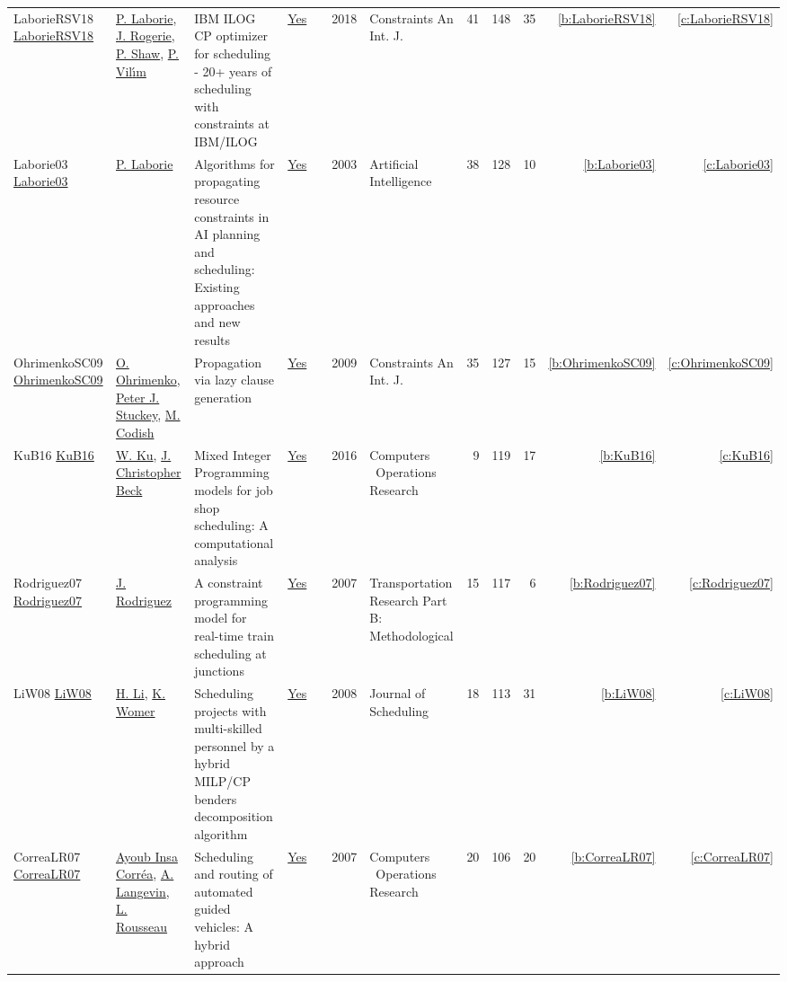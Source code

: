 {\begin{longtable}{>{\raggedright\arraybackslash}p{3cm}>{\raggedright\arraybackslash}p{6cm}>{\raggedright\arraybackslash}p{6.5cm}rrrp{2.5cm}rrrrr}
LaborieRSV18 \href{https://doi.org/10.1007/s10601-018-9281-x}{LaborieRSV18} & \hyperref[auth:a118]{P. Laborie}, \hyperref[auth:a119]{J. Rogerie}, \hyperref[auth:a120]{P. Shaw}, \hyperref[auth:a121]{P. Vil{\'{\i}}m} & {IBM} {ILOG} {CP} optimizer for scheduling - 20+ years of scheduling with constraints at {IBM/ILOG} & \href{../works/LaborieRSV18.pdf}{Yes} & \cite{LaborieRSV18} & 2018 & Constraints An Int. J. & 41 & 148 & 35 & \ref{b:LaborieRSV18} & \ref{c:LaborieRSV18}\\
Laborie03 \href{http://dx.doi.org/10.1016/s0004-3702(02)00362-4}{Laborie03} & \hyperref[auth:a118]{P. Laborie} & Algorithms for propagating resource constraints in AI planning and scheduling: Existing approaches and new results & \href{../works/Laborie03.pdf}{Yes} & \cite{Laborie03} & 2003 & Artificial Intelligence & 38 & 128 & 10 & \ref{b:Laborie03} & \ref{c:Laborie03}\\
OhrimenkoSC09 \href{http://dx.doi.org/10.1007/s10601-008-9064-x}{OhrimenkoSC09} & \hyperref[auth:a873]{O. Ohrimenko}, \hyperref[auth:a126]{Peter J. Stuckey}, \hyperref[auth:a874]{M. Codish} & Propagation via lazy clause generation & \href{../works/OhrimenkoSC09.pdf}{Yes} & \cite{OhrimenkoSC09} & 2009 & Constraints An Int. J. & 35 & 127 & 15 & \ref{b:OhrimenkoSC09} & \ref{c:OhrimenkoSC09}\\
KuB16 \href{https://doi.org/10.1016/j.cor.2016.04.006}{KuB16} & \hyperref[auth:a337]{W. Ku}, \hyperref[auth:a89]{J. Christopher Beck} & Mixed Integer Programming models for job shop scheduling: {A} computational analysis & \href{../works/KuB16.pdf}{Yes} & \cite{KuB16} & 2016 & Computers \  Operations Research & 9 & 119 & 17 & \ref{b:KuB16} & \ref{c:KuB16}\\
Rodriguez07 \href{https://www.sciencedirect.com/science/article/pii/S0191261506000233}{Rodriguez07} & \hyperref[auth:a791]{J. Rodriguez} & A constraint programming model for real-time train scheduling at junctions & \href{../works/Rodriguez07.pdf}{Yes} & \cite{Rodriguez07} & 2007 & Transportation Research Part B: Methodological & 15 & 117 & 6 & \ref{b:Rodriguez07} & \ref{c:Rodriguez07}\\
LiW08 \href{http://dx.doi.org/10.1007/s10951-008-0079-3}{LiW08} & \hyperref[auth:a974]{H. Li}, \hyperref[auth:a975]{K. Womer} & Scheduling projects with multi-skilled personnel by a hybrid MILP/CP benders decomposition algorithm & \href{../works/LiW08.pdf}{Yes} & \cite{LiW08} & 2008 & Journal of Scheduling & 18 & 113 & 31 & \ref{b:LiW08} & \ref{c:LiW08}\\
CorreaLR07 \href{http://dx.doi.org/10.1016/j.cor.2005.07.004}{CorreaLR07} & \hyperref[auth:a969]{Ayoub Insa Corréa}, \hyperref[auth:a970]{A. Langevin}, \hyperref[auth:a907]{L. Rousseau} & Scheduling and routing of automated guided vehicles: A hybrid approach & \href{../works/CorreaLR07.pdf}{Yes} & \cite{CorreaLR07} & 2007 & Computers \  Operations Research & 20 & 106 & 20 & \ref{b:CorreaLR07} & \ref{c:CorreaLR07}\\

\end{longtable}}

